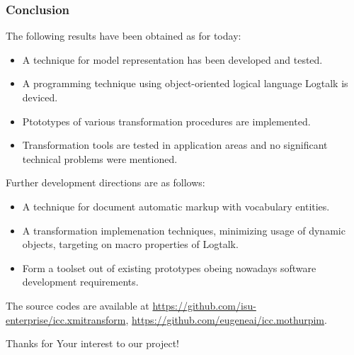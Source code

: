 \documentclass[10pt]{beamer}
\begin{document}
\begin{frame}
  \frametitle{Conclusion}
  The following results have been obtained as for today:
  \begin{itemize}
  \item A technique for model representation has been developed and tested.
  \item A programming technique using object-oriented logical language Logtalk is deviced.
  \item Ptototypes of various transformation procedures are implemented.
  \item Transformation tools are tested in application areas and no significant technical problems were mentioned.
  \end{itemize}
  Further development directions are as follows:
  \begin{itemize}
  \item A technique for document automatic markup with vocabulary entities.
  \item A transformation implemenation techniques, minimizing usage of dynamic objects, targeting on macro properties of Logtalk.
  \item Form a toolset out of existing prototypes obeing nowadays software development requirements.
  \end{itemize}
  The source codes are available at \url{https://github.com/isu-enterprise/icc.xmitransform}, \url{https://github.com/eugeneai/icc.mothurpim}.
\end{frame}

\begin{frame}
  \begin{center}
  \Large Thanks for Your interest to our project!
\end{center}
\end{frame}
\end{document}
